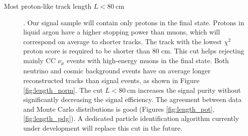 \begin{description}
\item[Most proton-like track length $L < 80~\mathrm{cm}$]. Our signal sample will contain only protons in the final state. Protons in liquid argon have a higher stopping power than muons, which will correspond on average to shorter tracks. The track with the lowest $\chi^{2}$ proton score is required to be shorter than 80 cm. This cut helps rejecting mainly CC $\nu_{\mu}$ events with high-energy muons in the final state. 
Both neutrino and cosmic background events have on average longer reconstructed tracks than signal events, as shown in Figure \ref{fig:length_norm}. The cut $L < 80~$cm increases the signal purity without significantly decreasing the signal efficiency. The agreement between data and Monte Carlo distributions is good (Figures \ref{fig:length_pot}, \ref{fig:length_pdg}). A dedicated particle identification algorithm currently under development will replace this cut in the future.

\end{description}


